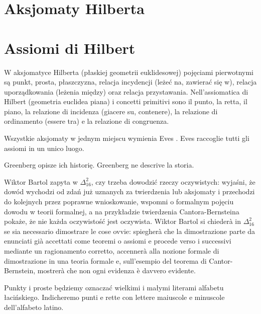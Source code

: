 
%

\section{Aksjomaty Hilberta} %
\section{Assiomi di Hilbert} %


W aksjomatyce Hilberta (płaskiej geometrii euklidesowej) pojęciami pierwotnymi są punkt, prosta, płaszczyzna, relacja incydencji (leżeć na, zawierać się w), relacja uporządkowania (leżenia między) oraz relacja przystawania. %
Nell'assiomatica di Hilbert (geometria euclidea piana) i concetti primitivi sono il punto, la retta, il piano, la relazione di incidenza (giacere su, contenere), la relazione di ordinamento (essere tra) e la relazione di congruenza. %

Wszystkie aksjomaty w jednym miejscu wymienia Eves \cite[s. 380-382]{eves1_1972}. %
Eves \cite[pp.~380--382]{eves1_1972} raccoglie tutti gli assiomi in un unico luogo. %

Greenberg \cite{greenberg_2010} opisze ich historię. %
Greenberg \cite{greenberg_2010} ne descrive la storia. %

Wiktor Bartol zapyta w $\Delta_{16}^{2}$, czy trzeba dowodzić rzeczy oczywistych: wyjaśni, że dowód wychodzi od zdań już uznanych za twierdzenia lub aksjomaty i przechodzi do kolejnych przez poprawne wnioskowanie, wspomni o formalnym pojęciu dowodu w teorii formalnej, a na przykładzie twierdzenia Cantora-Bernsteina pokaże, że nie każda oczywistość jest oczywista. %
Wiktor Bartol si chiederà in $\Delta_{16}^{2}$ se sia necessario dimostrare le cose ovvie: spiegherà che la dimostrazione parte da enunciati già accettati come teoremi o assiomi e procede verso i successivi mediante un ragionamento corretto, accennerà alla nozione formale di dimostrazione in una teoria formale e, sull'esempio del teorema di Cantor-Bernstein, mostrerà che non ogni evidenza è davvero evidente. %

Punkty i proste będziemy oznaczać wielkimi i małymi literami alfabetu łacińskiego. %
Indicheremo punti e rette con lettere maiuscole e minuscole dell'alfabeto latino. %

